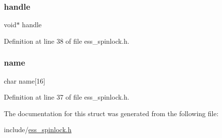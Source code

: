 \mbox{\label{structess__platform__spinlock_a81011b79683fab64ce3aff71114f8fdd}} 
\subsubsection{\texorpdfstring{handle}{handle}}
{\footnotesize\ttfamily void$\ast$ handle}



Definition at line 38 of file ess\+\_\+spinlock.\+h.

\mbox{\label{structess__platform__spinlock_acd328517a6cf718155c2e6e22b671ca9}} 
\subsubsection{\texorpdfstring{name}{name}}
{\footnotesize\ttfamily char name\mbox{[}16\mbox{]}}



Definition at line 37 of file ess\+\_\+spinlock.\+h.



The documentation for this struct was generated from the following file\+:\begin{DoxyCompactItemize}
\item 
include/\hyperlink{ess__spinlock_8h}{ess\+\_\+spinlock.\+h}\end{DoxyCompactItemize}
